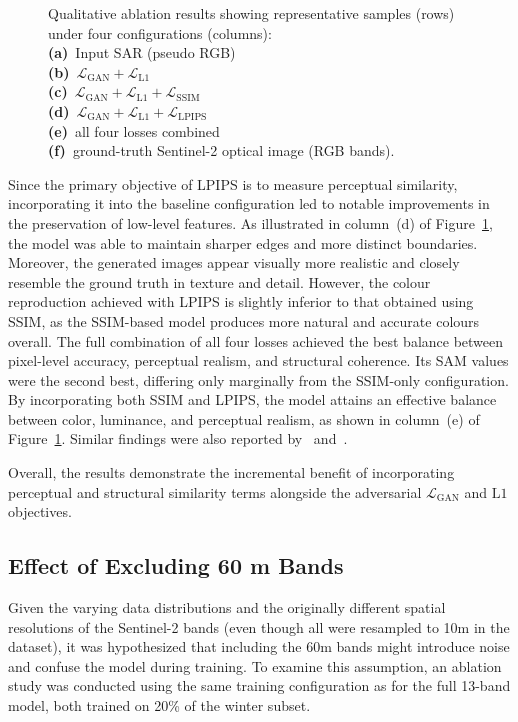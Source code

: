 \begin{figure}[!htbp]
    \caption[Qualitative ablation study across loss configurations]{%
    Qualitative ablation results showing representative samples (rows) under four configurations (columns):\\
    \textbf{(a)}~Input SAR (pseudo RGB)\\
    \textbf{(b)}~$\mathcal{L}_{\text{GAN}}{+}\mathcal{L}_{\text{L1}}$\\
    \textbf{(c)}~$\mathcal{L}_{\text{GAN}}{+}\mathcal{L}_{\text{L1}}{+}\mathcal{L}_{\text{SSIM}}$\\
    \textbf{(d)}~$\mathcal{L}_{\text{GAN}}{+}\mathcal{L}_{\text{L1}}{+}\mathcal{L}_{\text{LPIPS}}$\\
    \textbf{(e)}~all four losses combined\\
    \textbf{(f)}~ground-truth Sentinel-2 optical image (RGB bands).
    }
    \label{fig:ablation_samples}
\end{figure}

Since the primary objective of LPIPS is to measure perceptual similarity, incorporating it into the baseline configuration led to notable improvements in the preservation of low-level features. As illustrated in column~(d) of Figure~\ref{fig:ablation_samples}, the model was able to maintain sharper edges and more distinct boundaries. Moreover, the generated images appear visually more realistic and closely resemble the ground truth in texture and detail. However, the colour reproduction achieved with LPIPS is slightly inferior to that obtained using SSIM, as the SSIM-based model produces more natural and accurate colours overall.
The full combination of all four losses achieved the best balance between pixel-level accuracy, perceptual realism, and structural coherence. 
Its SAM values were the second best, differing only marginally from the SSIM-only configuration. 
By incorporating both SSIM and LPIPS, the model attains an effective balance between color, luminance, and perceptual realism, as shown in column~(e) of Figure~\ref{fig:ablation_samples}. 
Similar findings were also reported by~\cite{s2o_ViT_cGAN} and~\cite{CR_RS_GAN_s2o}. 
 
Overall, the results demonstrate the incremental benefit of incorporating perceptual and structural similarity terms alongside the adversarial $\mathcal{L}_{\text{GAN}}$ and $\mathrm{L1}$ objectives. 

\subsection{Effect of Excluding 60 m Bands}
\label{subsec:ablation_execluding_60m}
Given the varying data distributions and the originally different spatial resolutions of the Sentinel-2 bands (even though all were resampled to 10m in the dataset), it was hypothesized that including the 60m bands might introduce noise and confuse the model during training. To examine this assumption, an ablation study was conducted using the same training configuration as for the full 13-band model, both trained on 20\% of the winter subset.

